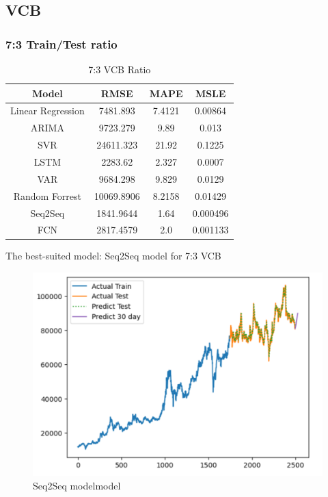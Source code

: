 \documentclass{ieeeojies}
\begin{document}
\subsection{VCB}
\subsubsection{7:3 Train/Test ratio}

\begin{table}[H]
    \centering
    \begin{tabular}{|c|c|c|c|}
    \hline
    Model & \textbf{RMSE} & \textbf{MAPE} & \textbf{MSLE} \\
    \hline
    Linear Regression & 7481.893 & 7.4121 & 0.00864 \\
    \hline
    ARIMA & 9723.279 & 9.89 & 0.013 \\
    \hline
    SVR & 24611.323 & 21.92 & 0.1225 \\
    \hline
    LSTM & 2283.62 & 2.327 & 0.0007 \\
    \hline
    VAR & 9684.298 & 9.829 & 0.0129 \\
    \hline
    Random Forrest & 10069.8906 & 8.2158 & 0.01429 \\
    \hline
    \rowcolor{red!10}
    Seq2Seq & 1841.9644 & 1.64 & 0.000496 \\
    \hline
    FCN & 2817.4579 & 2.0 & 0.001133 \\
    \hline
    \end{tabular}
    \caption{7:3 VCB Ratio}
    \label{tab:my_label}
\end{table}
The best-suited model: Seq2Seq model for 7:3 VCB
\begin{figure}[H]
    \centering
    \includegraphics[width=1\linewidth]{vcb_s2s_73.png}
    \caption{Seq2Seq modelmodel}
    \label{fig:enter-label}
\end{figure}
\end{document}
